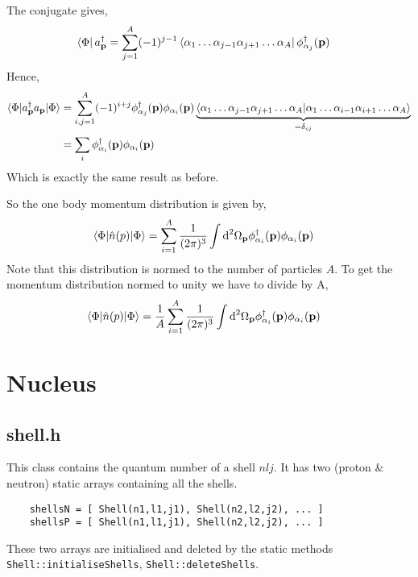\documentclass[10pt]{article}
\begin{document}
The conjugate gives,
\begin{align}
	\bra{\Phi} a_{\mathbf{p}}^{\dagger} &= \sum_{j=1}^{A} (-1)^{j-1} \bra{ \alpha_1 \ldots \alpha_{j-1} \alpha_{j+1} \ldots \alpha_A} \phi_{\alpha_j}^{\dagger}(\mathbf{p})
\end{align}
Hence,
\begin{align}
\braket{ \Phi | a_{\mathbf{p}}^{\dagger} a_{\mathbf{p}} | \Phi} &= \sum_{i,j=1}^{A} (-1)^{i+j} \phi_{\alpha_j}^{\dagger}(\mathbf{p}) \phi_{\alpha_{i}}(\mathbf{p})  \underbrace{\braket{ \alpha_1 \ldots \alpha_{j-1} \alpha_{j+1} \ldots \alpha_A | \alpha_1 \ldots \alpha_{i-1} \alpha_{i+1} \ldots \alpha_A }}_{=\delta_{ij}} \\
	&= \sum_{i} \phi_{\alpha_i}^{\dagger}(\mathbf{p}) \phi_{\alpha_{i}}(\mathbf{p})
\end{align}
Which is exactly the same result as before.



So the one body momentum distribution is given by,
\begin{align}
	\braket{ \Phi | \hat{n}(p) | \Phi} &=  \sum_{i=1}^{A} \frac{1}{(2 \pi)^{3}} \int \textrm{d}^{2} \Omega_{\mathbf{p}}\phi_{\alpha_i}^{\dagger}(\mathbf{p}) \phi_{\alpha_i}(\mathbf{p})
\end{align}
Note that this distribution is normed to the number of particles $A$. To get the momentum distribution normed to unity we have to divide by A,
\begin{align}
	\braket{ \Phi | \hat{n}(p) | \Phi} &=  \frac{1}{A} \sum_{i=1}^{A} \frac{1}{(2 \pi)^{3}} \int \textrm{d}^{2} \Omega_{\mathbf{p}}\phi_{\alpha_i}^{\dagger}(\mathbf{p}) \phi_{\alpha_i}(\mathbf{p})
\end{align}

\section{Nucleus}
\subsection{shell.h}
This class contains the quantum number of a shell $nlj$. It has two (proton \& neutron) static arrays containing all the shells.
\begin{verbatim}
	shellsN = [ Shell(n1,l1,j1), Shell(n2,l2,j2), ... ]
	shellsP = [ Shell(n1,l1,j1), Shell(n2,l2,j2), ... ]
\end{verbatim}
These two arrays are initialised and deleted by the static methods \texttt{Shell::initialiseShells}, \texttt{Shell::deleteShells}.
\end{document}
